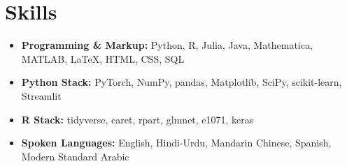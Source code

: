 \documentclass[letterpaper,10pt]{article}
\begin{document}

\section{Skills}
\begin{itemize}[leftmargin=0.15in, label={}]
    \item \textbf{Programming \& Markup:} Python, R, Julia, Java, Mathematica, MATLAB, \LaTeX, HTML, CSS, SQL
    \item \vspace{-5pt} \textbf{Python Stack:} PyTorch, NumPy, pandas, Matplotlib, SciPy, scikit-learn, Streamlit
    \item \vspace{-5pt} \textbf{R Stack:} tidyverse, caret, rpart, glmnet, e1071, keras
    \item \vspace{-5pt} \textbf{Spoken Languages:} English, Hindi-Urdu, Mandarin Chinese, Spanish, Modern Standard Arabic
\end{itemize}
\end{document}
